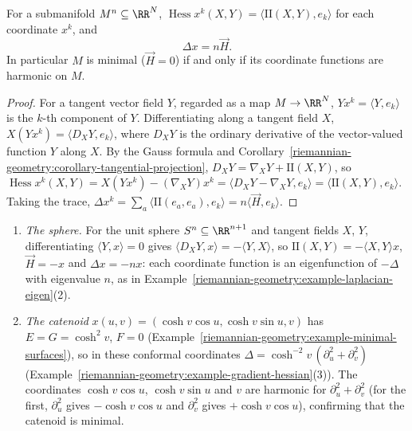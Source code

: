 \begin{proposition}\label{riemannian-geometry:proposition-beltrami-formula}
For a submanifold $M^n \subseteq \RR^N$, $\operatorname{Hess}x^k(X, Y) = \langle\mathrm{II}(X, Y), e_k\rangle$ for each coordinate $x^k$, and
\[
\Delta x = n\vec{H} .
\]
In particular $M$ is minimal ($\vec{H} = 0$) if and only if its coordinate functions are harmonic on $M$.
\end{proposition}

\begin{proof}
For a tangent vector field $Y$, regarded as a map $M \to \RR^N$, $Yx^k = \langle Y, e_k\rangle$ is the $k$-th component of $Y$. Differentiating along a tangent field $X$,
$X(Yx^k) = \langle D_XY, e_k\rangle$, where $D_XY$ is the ordinary derivative of the vector-valued function $Y$ along $X$. By the Gauss formula and
Corollary~\ref{riemannian-geometry:corollary-tangential-projection}, $D_XY = \nabla_XY + \mathrm{II}(X, Y)$, so
$\operatorname{Hess}x^k(X, Y) = X(Yx^k) - (\nabla_XY)x^k = \langle D_XY - \nabla_XY, e_k\rangle = \langle\mathrm{II}(X, Y), e_k\rangle$. Taking the trace,
$\Delta x^k = \sum_a\langle\mathrm{II}(e_a, e_a), e_k\rangle = n\langle\vec{H}, e_k\rangle$.
\end{proof}

\begin{example}\label{riemannian-geometry:example-beltrami-formula}
\begin{enumerate}
\item \emph{The sphere.} For the unit sphere $S^n \subseteq \RR^{n+1}$ and tangent fields $X$, $Y$, differentiating $\langle Y, x\rangle = 0$ gives $\langle D_XY, x\rangle = -\langle Y, X\rangle$, so
$\mathrm{II}(X, Y) = -\langle X, Y\rangle x$, $\vec{H} = -x$ and $\Delta x = -nx$: each coordinate function is an eigenfunction of $-\Delta$ with eigenvalue $n$, as in
Example~\ref{riemannian-geometry:example-laplacian-eigen}(2).
\item \emph{The catenoid} $x(u, v) = (\cosh v\cos u, \cosh v\sin u, v)$ has $E = G = \cosh^2v$, $F = 0$ (Example~\ref{riemannian-geometry:example-minimal-surfaces}), so in these conformal coordinates
$\Delta = \cosh^{-2}v\,(\partial_u^2 + \partial_v^2)$ (Example~\ref{riemannian-geometry:example-gradient-hessian}(3)). The coordinates $\cosh v\cos u$, $\cosh v\sin u$ and $v$ are harmonic for
$\partial_u^2 + \partial_v^2$ (for the first, $\partial_u^2$ gives $-\cosh v\cos u$ and $\partial_v^2$ gives $+\cosh v\cos u$), confirming that the catenoid is minimal.
\end{enumerate}
\end{example}

